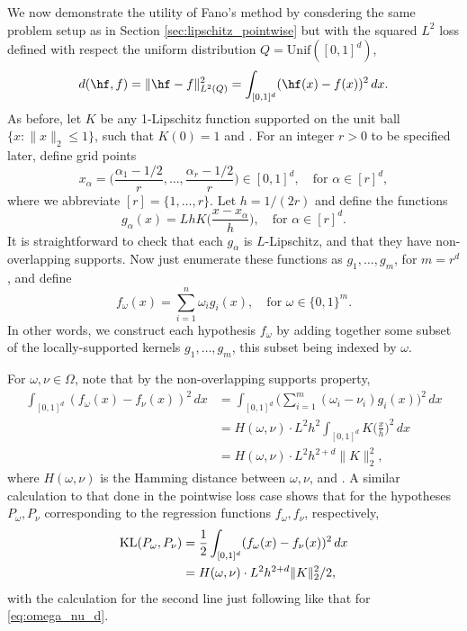 \documentclass{article}
\begin{document}
We now demonstrate the utility of Fano's method by consdering the same problem
setup as in Section \ref{sec:lipschitz_pointwise} but with the squared $L^2$
loss defined with respect the uniform distribution $Q = \mathrm{Unif}([0,1]^d)$,  
\[
d(\hf, f) = \|\hf - f\|_{L^2(Q)}^2 = \int_{[0,1]^d} (\hf(x) - f(x))^2 \, dx. 
\]
As before, let $K$ be any 1-Lipschitz function supported on the unit ball $\{ x
: \|x\|_2 \leq 1 \}$, such that $K(0) = 1$ and  . For an integer $r > 0$ to be specified later, define grid points  
\[
x_\alpha = \bigg( \frac{\alpha_1-1/2}{r}, \dots, \frac{\alpha_r-1/2}{r} \bigg)
\in [0,1]^d, \quad \text{for $\alpha \in [r]^d$}, 
\]
where we abbreviate $[r] = \{1,\dots,r\}$. Let $h=1/(2r)$ and define the functions 
\[
g_\alpha(x) = Lh K \bigg( \frac{x - x_\alpha}{h} \bigg), \quad \text{for $\alpha
  \in [r]^d$}.
\]
It is straightforward to check that each $g_\alpha$ is $L$-Lipschitz, and that
they have non-overlapping supports. Now just enumerate these functions as
$g_1,\dots,g_m$, for $m = r^d$, and define  
\[
f_\omega(x) = \sum_{i=1}^n \omega_i g_i(x), \quad \text{for $\omega \in
  \{0,1\}^m$}.  
\]
In other words, we construct each hypothesis $f_\omega$ by adding together some
subset of the locally-supported kernels $g_1,\dots,g_m$, this subset being
indexed by $\omega$. 

For $\omega,\nu \in \Omega$, note that by the non-overlapping supports property, 
\begin{align}
\nonumber
\int_{[0,1]^d} (f_\omega(x) - f_\nu(x))^2 \, dx
&= \int_{[0,1]^d} \bigg( \sum_{i=1}^m (\omega_i - \nu_i) g_i(x) \bigg)^2 \, dx
  \\    
\nonumber
&= H(\omega, \nu) \cdot L^2 h^2 \int_{[0,1]^d} K \bigg( \frac{x}{h} \bigg)^2 \,
  dx \\ 
\label{eq:omega_nu_d}
&= H(\omega, \nu) \cdot L^2 h^{2+d} \|K\|_2^2,
\end{align}
where $H(\omega, \nu)$ is the Hamming distance between $\omega,\nu$, and  
. A similar calculation to that done in
the pointwise loss case shows that for the hypotheses $P_\omega,P_\nu$
corresponding to the regression functions $f_\omega,f_\nu$, respectively,  
\begin{align}
\nonumber
\mathrm{KL}(P_\omega,P_\nu) 
&= \frac{1}{2} \int_{[0,1]^d} (f_\omega(x) - f_\nu(x))^2 \, dx \\ 
\label{eq:omega_nu_kl}
&= H(\omega, \nu) \cdot L^2 h^{2+d} \|K\|_2^2 / 2,
\end{align}
with the calculation for the second line just following like that for
\eqref{eq:omega_nu_d}.  
\end{document}
